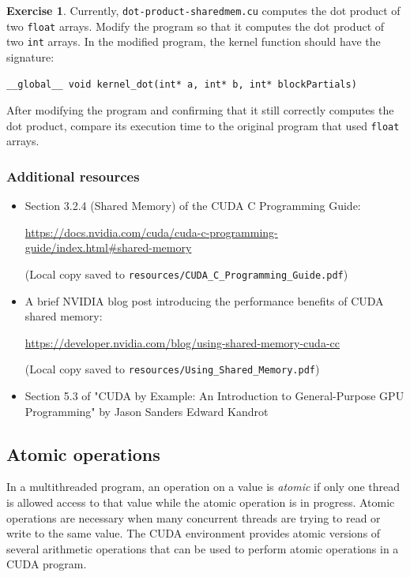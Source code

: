 \documentclass{article}
\newcommand{\resource}[1]{(Local copy saved to \texttt{#1})}
\theoremstyle{definition}
\newtheorem{exercise}{Exercise}
\begin{document}
\begin{exercise}
Currently, \texttt{dot-product-sharedmem.cu} computes the dot product of two \texttt{float} arrays. Modify the program so that it computes the dot product of two \texttt{int} arrays. In the modified program, the kernel function should have the signature:
\begin{verbatim}
__global__ void kernel_dot(int* a, int* b, int* blockPartials)
\end{verbatim}
After modifying the program and confirming that it still correctly computes the dot product, compare its execution time to the original program that used \texttt{float} arrays.
\end{exercise}

\subsubsection*{Additional resources}
\begin{itemize}
    \item Section 3.2.4 (Shared Memory) of the CUDA C Programming Guide:
    
    \url{https://docs.nvidia.com/cuda/cuda-c-programming-guide/index.html#shared-memory}
    
    \resource{resources/CUDA\_C\_Programming\_Guide.pdf}
    
    \item A brief NVIDIA blog post introducing the performance benefits of CUDA shared memory:
    
    \url{https://developer.nvidia.com/blog/using-shared-memory-cuda-cc}
    
    \resource{resources/Using\_Shared\_Memory.pdf}
    
    \item Section 5.3 of "CUDA by Example: An Introduction to General-Purpose GPU Programming" by Jason Sanders Edward Kandrot

\end{itemize}

\subsection{Atomic operations}

In a multithreaded program, an operation on a value is \emph{atomic} if only one thread is allowed access to that value while the atomic operation is in progress. Atomic operations are necessary when many concurrent threads are trying to read or write to the same value. The CUDA environment provides atomic versions of several arithmetic operations that can be used to perform atomic operations in a CUDA program.
\end{document}
